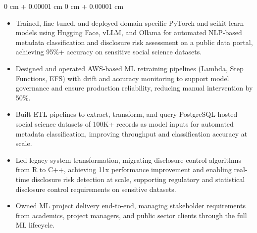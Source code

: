 \documentclass[6pt, letterpaper]{article}
\newenvironment{highlights}{
    \begin{itemize}[
        topsep=0.03 cm,
        parsep=0.03 cm,
        partopsep=0pt,
        itemsep=0pt,
        leftmargin=0 cm + 10pt
    ]
}{
    \end{itemize}
} %
\newenvironment{onecolentry}{
    \begin{adjustwidth}{
        0 cm + 0.00001 cm
    }{
        0 cm + 0.00001 cm
    }
}{
    \end{adjustwidth}
} %
\begin{document}
        \begin{onecolentry}
        \begin{highlights}

            \item Trained, fine-tuned, and deployed domain-specific PyTorch and scikit-learn models using Hugging Face, vLLM, and Ollama for automated NLP-based metadata classification and disclosure risk assessment on a public data portal, achieving 95\%+ accuracy on sensitive social science datasets.
            \item Designed and operated AWS-based ML retraining pipelines (Lambda, Step Functions, EFS) with drift and accuracy monitoring to support model governance and ensure production reliability, reducing manual intervention by 50\%.
            \item Built ETL pipelines to extract, transform, and query PostgreSQL-hosted social science datasets of 100K+ records as model inputs for automated metadata classification, improving throughput and classification accuracy at scale.
            \item Led legacy system transformation, migrating disclosure-control algorithms from R to C++, achieving 11x performance improvement and enabling real-time disclosure risk detection at scale, supporting regulatory and statistical disclosure control requirements on sensitive datasets.
            \item Owned ML project delivery end-to-end, managing stakeholder requirements from academics, project managers, and public sector clients through the full ML lifecycle.

        \end{highlights}
        \end{onecolentry}
\end{document}

